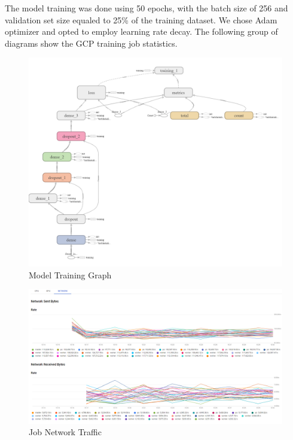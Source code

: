 The model training was done using 50 epochs, with the batch size of 256
and validation set size equaled to 25\% of the training dataset. We
chose Adam optimizer and opted to employ learning rate decay. The
following group of diagrams show the GCP training job statistics.

\begin{Schunk}
\begin{figure}[H]

{\centering \includegraphics[width=0.8\linewidth]{../images/graph} 

}

\caption[Model Training Graph]{Model Training Graph}\label{fig:grah}
\end{figure}
\end{Schunk}

\begin{Schunk}
\begin{figure}[H]

{\centering \includegraphics[width=1\linewidth]{../images/job_network} 

}

\caption[Job Network Traffic]{Job Network Traffic}\label{fig:net}
\end{figure}
\end{Schunk}

